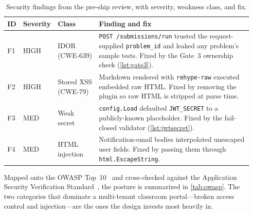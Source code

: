 \begin{table}[htbp]
\centering
\caption{Security findings from the pre-ship review, with severity, weakness
class, and fix.}
\label{tab:findings}
\begin{tabularx}{\linewidth}{@{}l l l X@{}}
\toprule
\textbf{ID} & \textbf{Severity} & \textbf{Class} & \textbf{Finding and fix} \\
\midrule
F1 & HIGH & IDOR (CWE-639) & \texttt{POST /submissions/run} trusted the
request-supplied \texttt{problem\_id} and leaked any problem's sample tests.
Fixed by the Gate~3 ownership check (\cref{lst:gate3}). \\
\addlinespace
F2 & HIGH & Stored XSS (CWE-79) & Markdown rendered with \texttt{rehype-raw}
executed embedded raw HTML. Fixed by removing the plugin so raw HTML is stripped
at parse time. \\
\addlinespace
F3 & MED & Weak secret & \texttt{config.Load} defaulted \texttt{JWT\_SECRET} to a
publicly-known placeholder. Fixed by the fail-closed validator
(\cref{lst:jwtsecret}). \\
\addlinespace
F4 & MED & HTML injection & Notification-email bodies interpolated unescaped
user fields. Fixed by passing them through \texttt{html.EscapeString}. \\
\bottomrule
\end{tabularx}
\end{table}

Mapped onto the OWASP Top~10~\cite{owasp-top10} and cross-checked against the
Application Security Verification Standard~\cite{owasp-asvs}, the posture is
summarized in \cref{tab:owasp}. The two categories that dominate a
multi-tenant classroom portal---broken access control and injection---are the
ones the design invests most heavily in.

